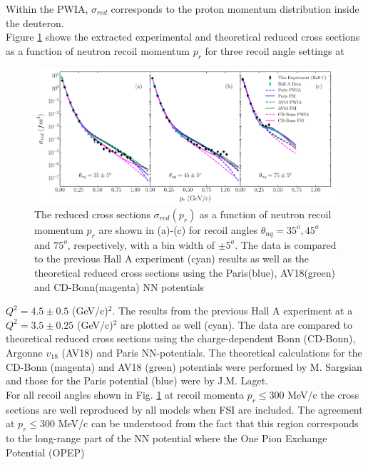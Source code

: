 Within the PWIA, $\sigma_{red}$ corresponds to the proton momentum distribution inside the deuteron. \\
\indent Figure \ref{fig:fig1} shows the extracted experimental and theoretical reduced cross sections as a function of neutron recoil momentum
$p_{r}$ for three recoil angle settings at
\onecolumngrid
\begin{center}
\begin{figure}[hb!]
\includegraphics[scale=0.46]{prl_plots/PRL_plot1.pdf}
\caption{The reduced cross sections $\sigma_{red}(p_{r})$ as a function of neutron recoil momentum $p_{r}$ are shown in (a)-(c) for recoil angles $\theta_{nq}=35^{o}, 45^{o}$ and $75^{o}$, respectively,
with a bin width of $\pm 5^{o}$. The data is compared to the previous Hall A experiment (cyan) results\cite{PhysRevLett.107.262501} as well as the theoretical reduced cross sections using the Paris(blue),
AV18(green) and CD-Bonn(magenta) NN potentials}
\label{fig:fig1}
\end{figure}
\end{center}
\twocolumngrid
\noindent $Q^{2}=4.5\pm0.5$ (GeV/c)$^{2}$. The results from the previous Hall A experiment\cite{PhysRevLett.107.262501} at a $Q^{2}=3.5\pm0.25$ (GeV/c)$^{2}$ are plotted as well (cyan). The data are compared to theoretical reduced
cross sections using the charge-dependent Bonn (CD-Bonn)\cite{PhysRevC.63.024001}, Argonne $v_{18}$ (AV18)\cite{PhysRevC.51.38} and Paris\cite{PhysRevC.21.861} NN-potentials. The theoretical calculations
for the CD-Bonn (magenta) and AV18 (green) potentials were performed by M. Sargsian\cite{PhysRevC.82.014612} and those for the Paris potential  (blue) were  by J.M. Laget\cite{LAGET2005}.\\
\indent For all recoil angles shown in Fig. \hyperref[fig:fig1]{1} at recoil momenta $p_{r}\leq300$ MeV/c the cross sections are well reproduced  by  all models when FSI are included.
The agreement at $p_{r}\leq300$ MeV/c can be understood from the fact that this region corresponds to the long-range part of the NN potential where the One Pion Exchange Potential (OPEP)
